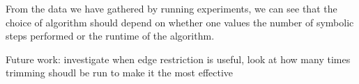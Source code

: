 \documentclass[../master/master.tex]{subfiles}
\begin{document}
From the data we have gathered by running experiments, we can see that the choice of algorithm should depend on whether one values the number of symbolic steps performed or the runtime of the algorithm. 

Future work: investigate when edge restriction is useful, look at how many times trimming shoudl be run to make it the most effective
\end{document}
